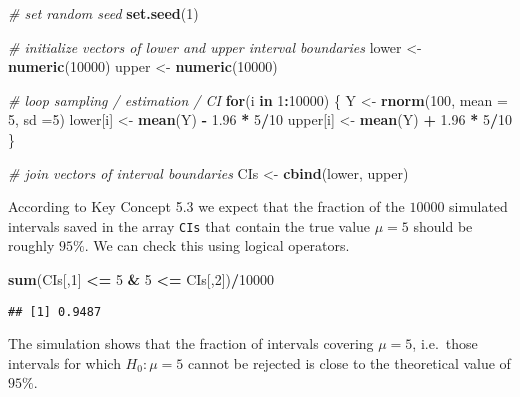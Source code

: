 \documentclass[]{book}
\newenvironment{Shaded}{\begin{snugshade}}{\end{snugshade}}
\newcommand{\KeywordTok}[1]{\textcolor[rgb]{0.13,0.29,0.53}{\textbf{#1}}}
\newcommand{\DataTypeTok}[1]{\textcolor[rgb]{0.13,0.29,0.53}{#1}}
\newcommand{\DecValTok}[1]{\textcolor[rgb]{0.00,0.00,0.81}{#1}}
\newcommand{\FloatTok}[1]{\textcolor[rgb]{0.00,0.00,0.81}{#1}}
\newcommand{\StringTok}[1]{\textcolor[rgb]{0.31,0.60,0.02}{#1}}
\newcommand{\CommentTok}[1]{\textcolor[rgb]{0.56,0.35,0.01}{\textit{#1}}}
\newcommand{\ControlFlowTok}[1]{\textcolor[rgb]{0.13,0.29,0.53}{\textbf{#1}}}
\newcommand{\OperatorTok}[1]{\textcolor[rgb]{0.81,0.36,0.00}{\textbf{#1}}}
\newcommand{\NormalTok}[1]{#1}
\theoremstyle{definition}
\theoremstyle{definition}
\theoremstyle{definition}
\theoremstyle{remark}
\begin{document}
\begin{Shaded}
\begin{Highlighting}[]
\CommentTok{# set random seed}
\KeywordTok{set.seed}\NormalTok{(}\DecValTok{1}\NormalTok{)}

\CommentTok{# initialize vectors of lower and upper interval boundaries}
\NormalTok{lower <-}\StringTok{ }\KeywordTok{numeric}\NormalTok{(}\DecValTok{10000}\NormalTok{)}
\NormalTok{upper <-}\StringTok{ }\KeywordTok{numeric}\NormalTok{(}\DecValTok{10000}\NormalTok{)}

\CommentTok{# loop sampling / estimation / CI}
\ControlFlowTok{for}\NormalTok{(i }\ControlFlowTok{in} \DecValTok{1}\OperatorTok{:}\DecValTok{10000}\NormalTok{) \{}
\NormalTok{  Y <-}\StringTok{ }\KeywordTok{rnorm}\NormalTok{(}\DecValTok{100}\NormalTok{, }\DataTypeTok{mean =} \DecValTok{5}\NormalTok{, }\DataTypeTok{sd =}\DecValTok{5}\NormalTok{)}
\NormalTok{  lower[i] <-}\StringTok{ }\KeywordTok{mean}\NormalTok{(Y) }\OperatorTok{-}\StringTok{ }\FloatTok{1.96} \OperatorTok{*}\StringTok{ }\DecValTok{5}\OperatorTok{/}\DecValTok{10}
\NormalTok{  upper[i] <-}\StringTok{ }\KeywordTok{mean}\NormalTok{(Y) }\OperatorTok{+}\StringTok{ }\FloatTok{1.96} \OperatorTok{*}\StringTok{ }\DecValTok{5}\OperatorTok{/}\DecValTok{10}
\NormalTok{\}}

\CommentTok{# join vectors of interval boundaries}
\NormalTok{CIs <-}\StringTok{ }\KeywordTok{cbind}\NormalTok{(lower, upper)}
\end{Highlighting}
\end{Shaded}

According to Key Concept 5.3 we expect that the fraction of the
\(10000\) simulated intervals saved in the array \texttt{CIs} that
contain the true value \(\mu=5\) should be roughly \(95\%\). We can
check this using logical operators.

\begin{Shaded}
\begin{Highlighting}[]
\KeywordTok{sum}\NormalTok{(CIs[,}\DecValTok{1}\NormalTok{] }\OperatorTok{<=}\StringTok{ }\DecValTok{5} \OperatorTok{&}\StringTok{ }\DecValTok{5} \OperatorTok{<=}\StringTok{ }\NormalTok{CIs[,}\DecValTok{2}\NormalTok{])}\OperatorTok{/}\DecValTok{10000}
\end{Highlighting}
\end{Shaded}

\begin{verbatim}
## [1] 0.9487
\end{verbatim}

The simulation shows that the fraction of intervals covering \(\mu=5\),
i.e.~those intervals for which \(H_0: \mu = 5\) cannot be rejected is
close to the theoretical value of \(95\%\).
\end{document}
